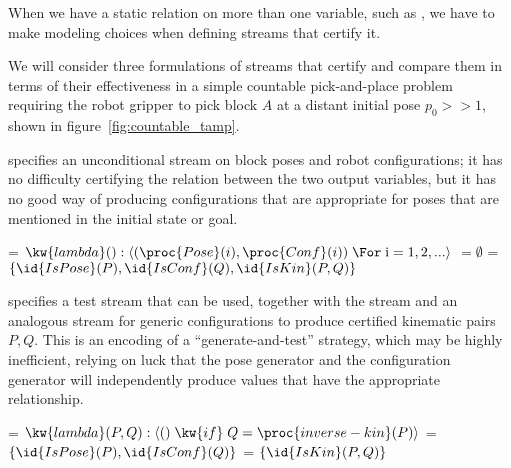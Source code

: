 \documentclass[letterpaper]{article} %
\theoremstyle{plain}\newtheorem{thm}{Theorem}
\theoremstyle{definition}\newtheorem{defn}{Definition}
\theoremstyle{plain}\newtheorem{lem}{Lemma}
\theoremstyle{plain}\newtheorem{cor}{Corollary}
\begin{document}
When we have a static relation on more than one variable, such as
, we have to make modeling choices when defining streams that
certify it.

We will consider three formulations of streams that certify 
and compare them in terms of their effectiveness in a simple countable pick-and-place
problem requiring the robot gripper to pick block $A$ at a distant
initial pose $p_0 >> 1$, shown in figure~\ref{fig:countable_tamp}.

 specifies an unconditional stream on block poses and
robot configurations;  it has no difficulty certifying the 
relation between the two output variables, but it has no good way of
producing configurations that are appropriate for poses that are
mentioned in the initial state or goal.  

\begin{footnotesize}
\begin{codebox}
\zi {} = $\kw{lambda} (): \langle (\proc{Pose}(i), \proc{Conf}(i)) \;\For\; \text{i} = 1, 2, ... \rangle$
\zi {} $ = \emptyset$
\zi {} = $\{\id{IsPose}(P), \id{IsConf}(Q), \id{IsKin}(P, Q)\}$
\end{codebox}
\end{footnotesize}

 specifies a test stream that can be used, together with
the  stream and an analogous stream for generic
configurations to produce certified kinematic pairs $P, Q$.  This is
an encoding of a ``generate-and-test'' strategy, which may be highly
inefficient, relying on luck that the pose generator and the
configuration generator will independently produce values that have
the appropriate relationship.

\begin{footnotesize}
\begin{codebox}
\zi {} = $\kw{lambda} (P, Q): \langle () \;\kw{if}\; Q = \proc{inverse-kin}(P)\rangle$
\zi {} = $\{\id{IsPose}(P), \id{IsConf}(Q)\}$
\zi {} = $\{\id{IsKin}(P, Q)\}$
\end{codebox}
\end{footnotesize}
\end{document}
